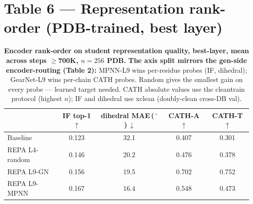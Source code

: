\documentclass[11pt,a4paper]{article}
\begin{document}
\section{Table 6 --- Representation rank-order (PDB-trained, best layer)}

\begin{table}[H]
\centering
\small
\begin{tabular}{l|cccc}
\toprule
& IF top-1 $\uparrow$ & dihedral MAE\,(\,$^\circ$\,)\,$\downarrow$ & CATH-A $\uparrow$ & CATH-T $\uparrow$ \\
\midrule
Baseline       & 0.123 & 32.1 & 0.407 & 0.301 \\
REPA L4-random & 0.146 & 20.2 & 0.476 & 0.378 \\
REPA L9-GN     & 0.156 & 19.5 & 0.702 & 0.752 \\
REPA L9-MPNN   & 0.167 & 16.4 & 0.548 & 0.473 \\
\bottomrule
\end{tabular}
\caption{\textbf{Encoder rank-order on student representation quality,
best-layer, mean across steps $\ge$700K, $n{=}256$ PDB.} \textbf{The
axis split mirrors the gen-side encoder-routing (Table 2):} MPNN-L9
wins per-residue probes (IF, dihedral); GearNet-L9 wins per-chain CATH
probes. Random gives the smallest gain on every probe --- learned
target needed. CATH absolute values use the cleantrain protocol (highest
$n$); IF and dihedral use xclean (doubly-clean cross-DB val).}
\end{table}
\end{document}
